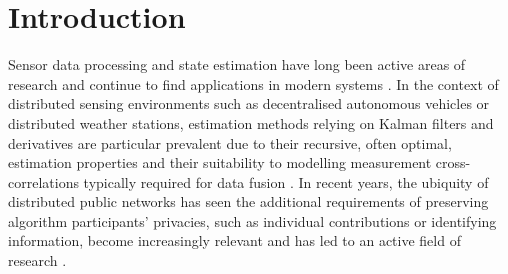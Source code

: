 \documentclass[letterpaper, 10 pt, conference]{ieeeconf}
\begin{document}
\section{Introduction}\label{sec:intro}
Sensor data processing and state estimation have long been active areas of research and continue to find applications in modern systems \cite{andersonOptimalFiltering1979,simonOptimalStateEstimation2006}. In the context of distributed sensing environments such as decentralised autonomous vehicles or distributed weather stations, estimation methods relying on Kalman filters and derivatives \cite{haugBayesianEstimationTracking2012} are particular prevalent due to their recursive, often optimal, estimation properties and their suitability to modelling measurement cross-correlations typically required for data fusion \cite{mutambaraDecentralizedEstimationControl1998,ligginsDistributedDataFusion2012}. In recent years, the ubiquity of distributed public networks has seen the additional requirements of preserving algorithm participants' privacies, such as individual contributions or identifying information, become increasingly relevant and has led to an active field of research \cite{renSecurityChallengesPublic2012,brennerSecretProgramExecution2011}.
\end{document}
